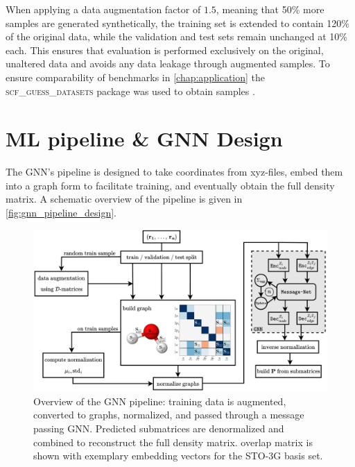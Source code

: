 When applying a data augmentation factor of $1.5$, meaning that 50\% more samples are generated synthetically, the training set is extended to contain 120\% of the original data, while the validation and test sets remain unchanged at 10\% each. This ensures that evaluation is performed exclusively on the original, unaltered data and avoids any data leakage through augmented samples. To ensure comparability of benchmarks in \autoref{chap:application} the \textsc{scf\_guess\_datasets} package was used to obtain samples \parencite{ref:milacher_scf_guess_datasets}.

\section{ML pipeline \& GNN Design}
\label{sec:gnn_design}
The GNN's pipeline is designed to take coordinates from xyz-files, embed them into a graph form to facilitate training, and eventually obtain the full density matrix. A schematic overview of the pipeline is given in \autoref{fig:gnn_pipeline_design}.

\begin{figure}[H]
    \centering
    \includegraphics[width=\textwidth]{../fig/gnn/GNN_design.pdf}
    \caption[GNN pipeline design]{Overview of the GNN pipeline: training data is augmented, converted to graphs, normalized, and passed through a message passing GNN. Predicted submatrices are denormalized and combined to reconstruct the full density matrix.  overlap matrix is shown with exemplary embedding vectors for the STO-3G basis set.}
    \label{fig:gnn_pipeline_design}
\end{figure}

